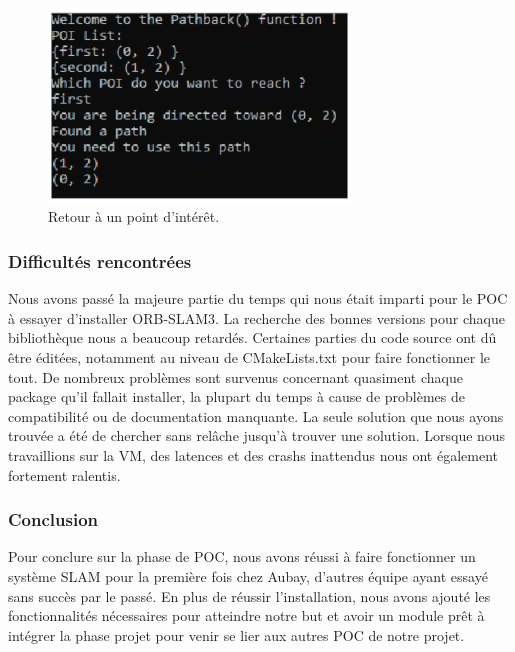 \documentclass[11pt]{article}
\begin{document}
        \begin{figure}[hbt]  
          \centering
          \includegraphics[width=80mm]{Test4.png}    
          \caption{Retour à un point d'intérêt.}
          \label{fig:Test4}
        \end{figure}           
        
      \pagebreak

      \subsubsection{Difficultés rencontrées}
        Nous avons passé la majeure partie du temps qui nous était imparti pour le POC à essayer d'installer ORB-SLAM3. La recherche des bonnes
        versions pour chaque bibliothèque nous a beaucoup retardés. Certaines parties du code source ont dû être éditées, notamment au niveau
        de CMakeLists.txt pour faire fonctionner le tout.
        De nombreux problèmes sont survenus concernant quasiment chaque package qu'il fallait installer, la plupart du temps à cause de
        problèmes de compatibilité ou de documentation manquante. La seule solution que nous ayons trouvée a été de chercher sans relâche jusqu'à
        trouver une solution.
        Lorsque nous travaillions sur la VM, des latences et des crashs inattendus nous ont également fortement ralentis.       
 
      \subsubsection{Conclusion}
        Pour conclure sur la phase de POC, nous avons réussi à faire fonctionner un système SLAM pour la première fois chez Aubay, d'autres
        équipe ayant essayé sans succès par le passé. En plus de réussir l'installation, nous avons ajouté les fonctionnalités nécessaires
        pour atteindre notre but et avoir un module prêt à intégrer la phase projet pour venir se lier aux autres POC de notre projet.
\end{document}
